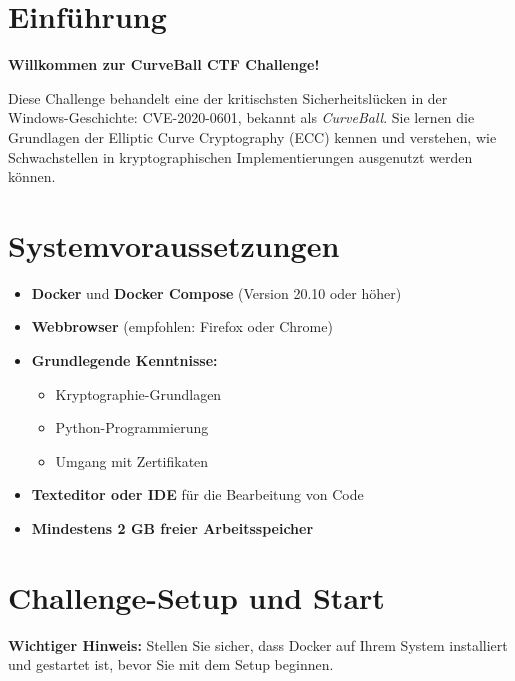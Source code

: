 \documentclass{article}
\begin{document}
\section{Einführung}

\begin{infobox}
\textbf{Willkommen zur CurveBall CTF Challenge!}

Diese Challenge behandelt eine der kritischsten Sicherheitslücken in der Windows-Geschichte: CVE-2020-0601, bekannt als \textit{CurveBall}. Sie lernen die Grundlagen der Elliptic Curve Cryptography (ECC) kennen und verstehen, wie Schwachstellen in kryptographischen Implementierungen ausgenutzt werden können.
\end{infobox}

\vspace{0.5cm}

\section{Systemvoraussetzungen}

\begin{itemize}[leftmargin=1.5cm]
    \item \textbf{Docker} und \textbf{Docker Compose} (Version 20.10 oder höher)
    \item \textbf{Webbrowser} (empfohlen: Firefox oder Chrome)
    \item \textbf{Grundlegende Kenntnisse:}
    \begin{itemize}
        \item Kryptographie-Grundlagen
        \item Python-Programmierung
        \item Umgang mit Zertifikaten
    \end{itemize}
    \item \textbf{Texteditor oder IDE} für die Bearbeitung von Code
    \item \textbf{Mindestens 2 GB freier Arbeitsspeicher}
\end{itemize}

\section{Challenge-Setup und Start}

\begin{warningbox}
\textbf{Wichtiger Hinweis:} Stellen Sie sicher, dass Docker auf Ihrem System installiert und gestartet ist, bevor Sie mit dem Setup beginnen.
\end{warningbox}
\end{document}
